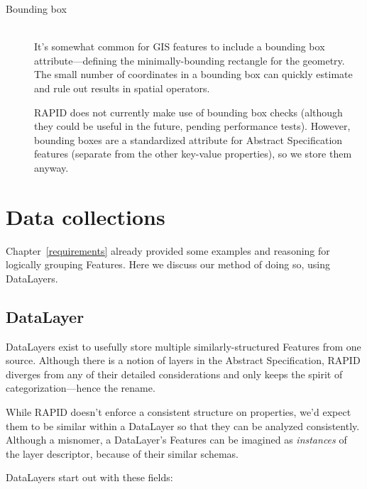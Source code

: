 \begin{description}
\item[Bounding box] \hfill \\
  It's somewhat common for GIS features to include a bounding box attribute---defining the minimally-bounding rectangle for the geometry. The small number of coordinates in a bounding box can quickly estimate and rule out results in spatial operators.

  RAPID does not currently make use of bounding box checks (although they could be useful in the future, pending performance tests). However, bounding boxes are a standardized attribute for Abstract Specification features (separate from the other key-value properties), so we store them anyway.
  
\end{description}

\section{Data collections}
Chapter~\ref{requirements} already provided some examples and reasoning for logically grouping Features. Here we discuss our method of doing so, using DataLayers.

\subsection{DataLayer}
DataLayers exist to usefully store multiple similarly-structured Features from one source. Although there is a notion of layers in the Abstract Specification, RAPID diverges from any of their detailed considerations and only keeps the spirit of categorization---hence the rename.

While RAPID doesn't enforce a consistent structure on properties, we'd expect them to be similar within a DataLayer so that they can be analyzed consistently. Although a misnomer, a DataLayer's Features can be imagined as \textit{instances} of the layer descriptor, because of their similar schemas.

DataLayers start out with these fields:

